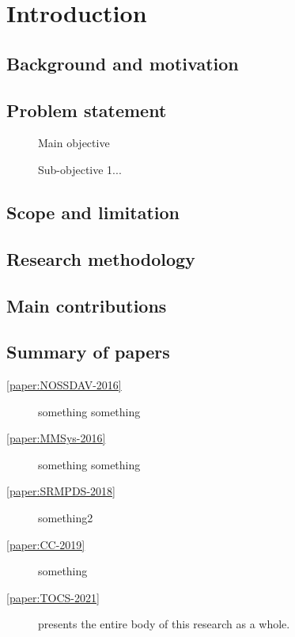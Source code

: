 \chapter{Introduction}\label{sec:intro}
\section{Background and motivation}

\section{Problem statement}
\begin{description}
	\item[] Main objective
	\item[] Sub-objective 1...
\end{description}

\section{Scope and limitation}

\section{Research methodology}

\section{Main contributions}

\section{Summary of papers}
\begin{description}
	\item[\cref{paper:NOSSDAV-2016}] something something
	\item[\cref{paper:MMSys-2016}] something something
	\item[\cref{paper:SRMPDS-2018}] something2
	\item[\cref{paper:CC-2019}] something
	\item[\cref{paper:TOCS-2021}] presents the entire body of this research as a whole.
\end{description}
